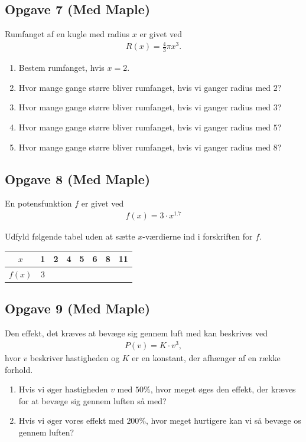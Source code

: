 \subsection*{Opgave 7 (Med Maple)}
Rumfanget af en kugle med radius $x$ er givet ved
\begin{align*}
	R(x) = \frac{4}{3}\pi x^3.
\end{align*}
\begin{enumerate}[label = \roman*)]
	\item Bestem rumfanget, hvis $x = 2$.
	\item Hvor mange gange større bliver rumfanget, hvis vi ganger radius med $2$?
	\item Hvor mange gange større bliver rumfanget, hvis vi ganger radius med $3$?
	\item Hvor mange gange større bliver rumfanget, hvis vi ganger radius med $5$?
	\item Hvor mange gange større bliver rumfanget, hvis vi ganger radius med $8$?
\end{enumerate}

\subsection*{Opgave 8 (Med Maple)}
En potensfunktion $f$ er givet ved
\begin{align*}
	f(x) = 3 \cdot x^{1.7}
\end{align*}

Udfyld følgende tabel uden at sætte $x$-værdierne ind i forskriften for $f$.
\begin{center}
	\begin{tabular}{c|c|c|c|c|c|c|c}
		$x$ & 1 & 2 & 4 & 5 & 6 & 8 & 11 \\ \hline
		$f(x)$ & 3 & & & & & &
	\end{tabular}
\end{center}

\subsection*{Opgave 9 (Med Maple)}
Den effekt, det kræves at bevæge sig gennem luft med kan beskrives ved 
\begin{align*}
P(v) = K\cdot v^3,
\end{align*}
hvor $v$ beskriver hastigheden og $K$ er en konstant, der afhænger af en række forhold.
\begin{enumerate}[label=\roman*)]
\item Hvis vi øger hastigheden $v$ med $50\%$, hvor meget øges den effekt, der kræves for at bevæge sig gennem luften så med? 
\item Hvis vi øger vores effekt med $200\%$, hvor meget hurtigere kan vi så bevæge os gennem luften?
\end{enumerate}
